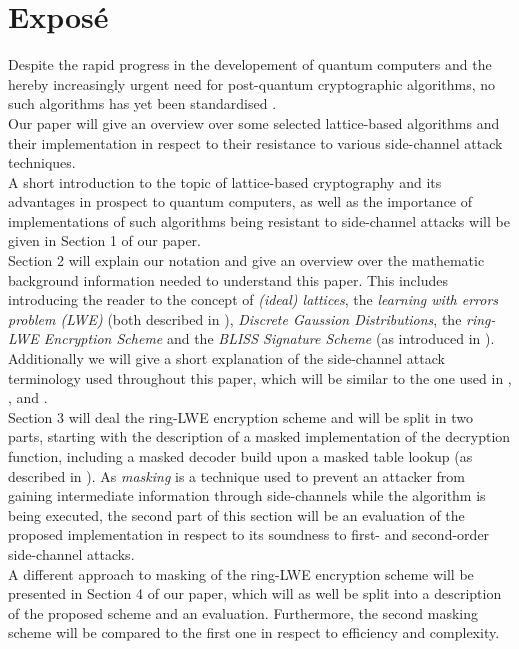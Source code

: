 %
%

\chapter{Expos\'{e}}
Despite the rapid progress in the developement of quantum computers and the hereby increasingly urgent need for post-quantum cryptographic algorithms, no such algorithms has yet been standardised \cite{Nist}.\\
Our paper will give an overview over some selected lattice-based algorithms and their implementation in respect to their resistance to various side-channel attack techniques.\\
A short introduction to the topic of lattice-based cryptography and its advantages in prospect to quantum computers, %
as well as the importance of implementations of such algorithms being resistant to side-channel attacks will be given in Section 1 of our paper.\\ 
Section 2 will explain our notation and give an overview over the mathematic background information needed to understand this paper. This includes introducing the reader to the concept of \textit{(ideal) lattices}, the \textit{learning with errors problem (LWE)} (both described in \cite{cryptoeprint:2012:230}), \textit{Discrete Gaussion Distributions}, the \textit{ring-LWE Encryption Scheme} and the \textit{BLISS Signature Scheme} (as introduced in \cite{cryptoeprint:2013:383}). Additionally we will give a short explanation of the side-channel attack terminology used throughout this paper, which will be similar to the one used in \cite{DBLP:conf/crypto/KocherJJ99}, \cite{Kocher2011}, \cite{cryptoeprint:2010:646} and \cite{cryptoeprint:2010:385}.\\ 
Section 3 will deal the ring-LWE encryption scheme and will be split in two parts, starting with the description of a masked implementation of the decryption function, including a masked decoder build upon a masked table lookup (as described in \cite{maskedRing}). As \textit{masking} is a technique used to prevent an attacker from gaining intermediate information through side-channels while the algorithm is being executed, the second part of this section will be an evaluation of the proposed implementation in respect to its soundness to first- and second-order side-channel attacks.\\ 
A different approach to masking of the ring-LWE encryption scheme \cite{Reparaz2016} will be presented in Section 4 of our paper, which will as well be split into a description of the proposed scheme and an evaluation. Furthermore, the second masking scheme will be compared to the first one in respect to efficiency and complexity.\\
